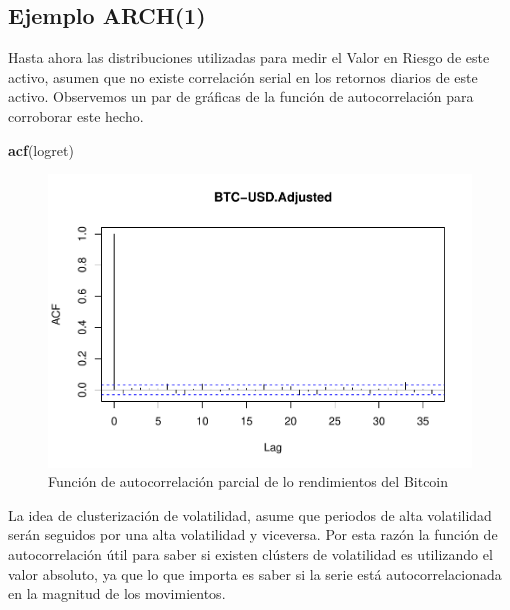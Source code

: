 \documentclass[
]{book}
\newenvironment{Shaded}{\begin{snugshade}}{\end{snugshade}}
\newcommand{\FunctionTok}[1]{\textcolor[rgb]{0.13,0.29,0.53}{\textbf{#1}}}
\newcommand{\NormalTok}[1]{#1}
\begin{document}
\hypertarget{ejemplo-arch1}{%
\subsection{Ejemplo ARCH(1)}\label{ejemplo-arch1}}

Hasta ahora las distribuciones utilizadas para medir el Valor en Riesgo de este activo, asumen que no existe correlación serial en los retornos diarios de este activo. Observemos un par de gráficas de la función de autocorrelación para corroborar este hecho.

\begin{Shaded}
\begin{Highlighting}[]
\FunctionTok{acf}\NormalTok{(logret)}
\end{Highlighting}
\end{Shaded}

\begin{figure}

{\centering \includegraphics{Notas-Series-Tiempo_files/figure-latex/fig105-1} 

}

\caption{Función de autocorrelación parcial de lo rendimientos del Bitcoin}\label{fig:fig105}
\end{figure}

La idea de clusterización de volatilidad, asume que periodos de alta volatilidad serán seguidos por una alta volatilidad y viceversa. Por esta razón la función de autocorrelación útil para saber si existen clústers de volatilidad es utilizando el valor absoluto, ya que lo que importa es saber si la serie está autocorrelacionada en la magnitud de los movimientos.
\end{document}
